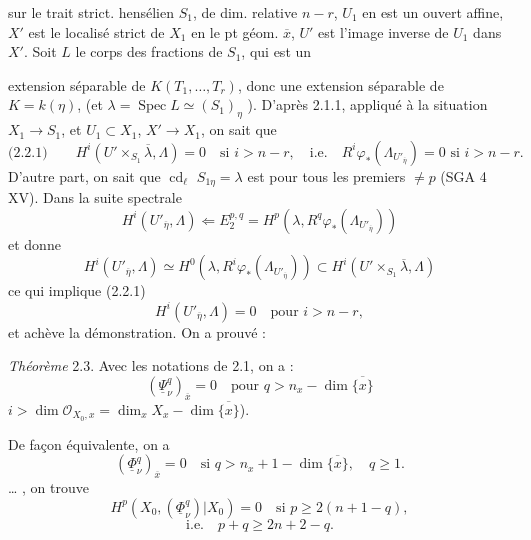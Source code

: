 \documentclass[11pt,a4paper]{article}
\begin{document}

 sur le trait strict. hensélien $S_1$, de dim. relative $n - r$, $U_1$ en est un ouvert affine, $X'$ est le localisé strict de $X_1$ en le pt géom. $\overline{x}$, $U'$ est l'image inverse de $U_1$ dans $X'$. Soit $L$ le corps des fractions de $S_1$, qui est un


extension  séparable de $K(T_1, \ldots, T_r)$, donc une extension séparable de $K = k(\eta)$, (et $\lambda = \operatorname{Spec} L \simeq (S_1)_\eta$ \struck{\ill{}}). D'après 2.1.1, appliqué à la situation $X_1 \to S_1$, et $U_1 \subset X_1$, $X' \to X_1$, on sait que
\[
\text{(2.2.1)} \qquad H^i(U' \times_{S_1} \overline{\lambda}, \Lambda) = 0 \quad \text{si } i > n - r , \quad \text{i.e.} \quad R^i \varphi_*(\Lambda_{U'_{\overline{\eta}}}) = 0 \text{ si } i > n - r .
\]
D'autre part, \struck{$\overline{\lambda}$ \ill{}} on sait que \struck{\ill{}} $\operatorname{cd}_\ell$  $S_{1\eta} = \lambda$ est  pour tous les  premiers $\neq p$ (SGA 4 XV). Dans la suite spectrale
\[
H^i(U'_{\overline{\eta}}, \Lambda) \Longleftarrow E_2^{p,q} = H^p(\lambda, R^q \varphi_*(\Lambda_{U'_{\overline{\eta}}}))
\]
 et donne
\[
H^i(U'_{\overline{\eta}}, \Lambda) \simeq H^0(\lambda, R^i \varphi_*(\Lambda_{U'_{\overline{\eta}}})) \subset H^i(U' \times_{S_1} \overline{\lambda}, \Lambda)
\]
ce qui implique  (2.2.1)
\[
H^i(U'_{\overline{\eta}}, \Lambda) = 0 \quad \text{pour } i > n - r ,
\]
et achève la démonstration. On a prouvé :

\emph{Théorème} 2.3. Avec les notations de 2.1, on a  :
\[
(\underline{\Psi}^q_\nu)_{\overline{x}} = 0 \quad \text{pour } q > n_x - \dim \overline{\{x\}}
\]
  $i > \dim \mathcal{O}_{X_0, x} = \dim_x X_x - \dim \overline{\{x\}}$).

De façon équivalente, on a
\[
(\underline{\Phi}^q_\nu)_{\overline{x}} = 0 \quad \text{si } q > n_x + 1 - \dim \overline{\{x\}} , \quad q \geqslant 1 .
\]
 
…
, on trouve
\[
H^p(X_0, (\underline{\Phi}^q_\nu)|X_0) = 0 \quad \text{si } p \geqslant 2(n + 1 - q) ,
\]
\[
\text{i.e.} \quad p + q \geqslant 2n + 2 - q .
\]
\end{document}
